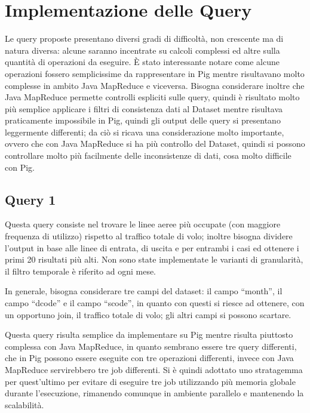 \documentclass[11pt]{article} %
\begin{document}
\section{Implementazione delle Query}

Le query proposte presentano diversi gradi di difficoltà, non crescente ma di natura diversa: alcune saranno incentrate su calcoli complessi ed altre sulla quantità di operazioni da eseguire. \`E stato interessante notare come alcune operazioni fossero semplicissime da rappresentare in Pig mentre risultavano molto complesse in ambito Java MapReduce e viceversa. Bisogna considerare inoltre che Java MapReduce permette controlli espliciti sulle query, quindi è risultato molto più semplice applicare i filtri di consistenza dati al Dataset mentre risultava praticamente impossibile in Pig, quindi gli output delle query si presentano leggermente differenti; da ciò si ricava una considerazione molto importante, ovvero che con Java MapReduce si ha più controllo del Dataset, quindi si possono controllare molto più facilmente delle inconsistenze di dati, cosa molto difficile con Pig.

\subsection{Query 1}

Questa query consiste nel trovare le linee aeree più occupate (con maggiore frequenza di utilizzo) rispetto al traffico totale di volo; inoltre bisogna dividere l'output in base alle linee di entrata, di uscita e per entrambi i casi ed ottenere i primi 20 risultati più alti. Non sono state implementate le varianti di granularità, il filtro temporale è riferito ad ogni mese.

In generale, bisogna considerare tre campi del dataset: il campo ``month'', il campo ``dcode'' e il campo ``scode'', in quanto con questi si riesce ad ottenere, con un opportuno join, il traffico totale di volo; gli altri campi si possono scartare.

Questa query risulta semplice da implementare su Pig mentre risulta piuttosto complessa con Java MapReduce, in quanto sembrano essere tre query differenti, che in Pig possono essere eseguite con tre operazioni differenti, invece con Java MapReduce servirebbero tre job differenti. Si è quindi adottato uno stratagemma per quest'ultimo per evitare di eseguire tre job utilizzando più memoria globale durante l'esecuzione, rimanendo comunque in ambiente parallelo e mantenendo la scalabilità.
\end{document}
